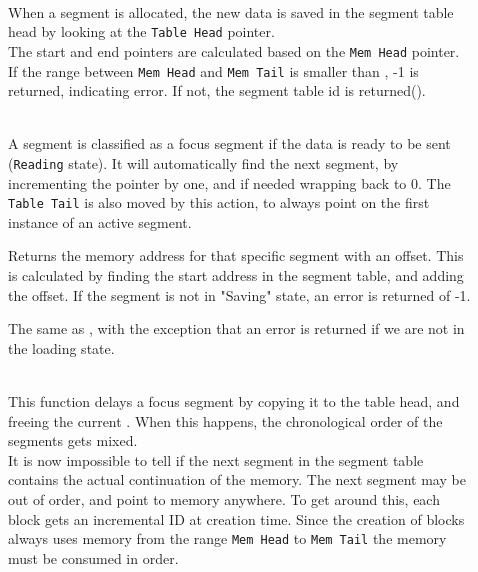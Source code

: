 \begin{description}
  \item[]\hfill\\
  When a segment is allocated, the new data is saved in the segment table
  head by looking at the \texttt{Table Head} pointer.\\
  The start and end pointers are calculated based on the \texttt{Mem Head}
  pointer. If the range between \texttt{Mem Head} and \texttt{Mem Tail} is
  smaller than , -1 is returned, indicating
  error. If not, the segment table id is
  returned().

  \item[]\hfill\\
  A segment is classified as a focus segment if the data is ready to be sent
  (\texttt{Reading} state). It will automatically find the next segment, by
  incrementing the pointer by one, and if needed wrapping back to 0. The
  \texttt{Table Tail} is also moved by this action, to always point on the first
  instance of an active segment.

  \item[]\hfill
  Returns the memory address for that specific segment with an offset.
  This is calculated by finding the start address in the segment table, and
  adding the offset. If the segment is not in "Saving" state, an error
  is returned of -1.

  \item[]\hfill
  The same as , with the exception
  that an error is returned if we are not in the loading state.

  \item[]\hfill\\
  This function delays a focus segment by copying it to the table head, and
  freeing the current . When this happens, the
  chronological order of the segments gets mixed.\\
  It is now impossible to tell if the next segment in the segment table contains
  the actual continuation of the memory. The next segment may be out of order,
  and point to memory anywhere. To get around this, each block gets an
  incremental ID at creation time. Since the creation of blocks always uses
  memory from the range \texttt{Mem Head} to \texttt{Mem Tail} the memory must
  be consumed in order.


\end{description}

